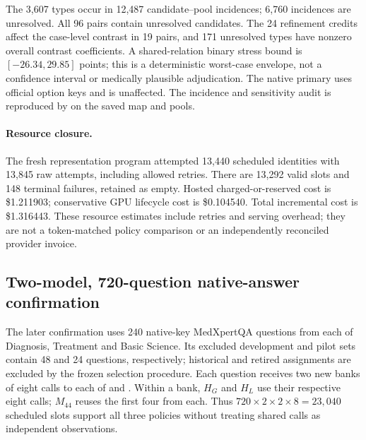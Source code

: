 The 3,607 types occur in 12,487 candidate--pool incidences; 6,760 incidences are unresolved. All 96 pairs contain unresolved candidates. The 24 refinement credits affect the case-level contrast in 19 pairs, and 171 unresolved types have nonzero overall contrast coefficients. A shared-relation binary stress bound is $[-26.34,29.85]$ points; this is a deterministic worst-case envelope, not a confidence interval or medically plausible adjudication. The native primary uses official option keys and is unaffected. The incidence and sensitivity audit is reproduced by  on the saved map and pools.

\paragraph{Resource closure.}
The fresh representation program attempted 13,440 scheduled identities with 13,845 raw attempts, including allowed retries. There are 13,292 valid slots and 148 terminal failures, retained as empty. Hosted charged-or-reserved cost is \$1.211903; conservative GPU lifecycle cost is \$0.104540. Total incremental cost is \$1.316443. These resource estimates include retries and serving overhead; they are not a token-matched policy comparison or an independently reconciled provider invoice.

\subsection{Two-model, 720-question native-answer confirmation}\label{app:native720}
The later confirmation uses 240 native-key MedXpertQA questions from each of Diagnosis, Treatment and Basic Science. Its excluded development and pilot sets contain 48 and 24 questions, respectively; historical and retired assignments are excluded by the frozen selection procedure. Each question receives two new banks of eight calls to each of  and . Within a bank, $H_G$ and $H_L$ use their respective eight calls; $M_{44}$ reuses the first four from each. Thus $720\times2\times2\times8=23{,}040$ scheduled slots support all three policies without treating shared calls as independent observations.

